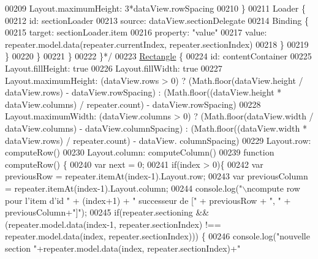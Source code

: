 \begin{DoxyCode}
{00209 \textcolor{comment}{                            Layout.maximumHeight: 3*dataView.rowSpacing}
00210 \textcolor{comment}{                        \}}
00211 \textcolor{comment}{                        Loader \{}
00212 \textcolor{comment}{                            id: sectionLoader}
00213 \textcolor{comment}{                            source: dataView.sectionDelegate}
00214 \textcolor{comment}{                            Binding \{}
00215 \textcolor{comment}{                                target: sectionLoader.item}
00216 \textcolor{comment}{                                property: "value"}
00217 \textcolor{comment}{                                value: repeater.model.data(repeater.currentIndex, repeater.sectionIndex)}
00218 \textcolor{comment}{                            \}}
00219 \textcolor{comment}{                        \}}
00220 \textcolor{comment}{                    \}}
00221 \textcolor{comment}{                \}}
00222 \textcolor{comment}{            \}*/}
00223         \hyperlink{classRectangle}{Rectangle} \{
00224             \textcolor{keywordtype}{id}: contentContainer
00225             Layout.fillHeight: \textcolor{keyword}{true}
00226             Layout.fillWidth: \textcolor{keyword}{true}
00227             Layout.maximumHeight: (dataView.rows > 0) ? (Math.floor(dataView.height / dataView.rows) - 
      dataView.rowSpacing) : (Math.floor((dataView.height * dataView.columns) / repeater.count) - dataView.rowSpacing)
00228             Layout.maximumWidth: (dataView.columns > 0) ? (Math.floor(dataView.width / dataView.columns) - 
      dataView.columnSpacing) : (Math.floor((dataView.width * dataView.rows) / repeater.count) - dataView.
      columnSpacing)
00229             Layout.row: computeRow()
00230             Layout.column: computeColumn()
00239             function computeRow() \{
00240                 var next = 0;
00241                 \textcolor{keywordflow}{if}(index > 0)\{
00242                     var previousRow = repeater.itemAt(index-1).Layout.row;
00243                     var previousColumn = repeater.itemAt(index-1).Layout.column;
00244                     console.log(\textcolor{stringliteral}{"\(\backslash\)ncompute row pour l'item  d'id "} + (index+1) + \textcolor{stringliteral}{" successeur de ["} + 
      previousRow + \textcolor{stringliteral}{", "} + previousColumn+\textcolor{stringliteral}{"]"});
00245                     \textcolor{keywordflow}{if}(repeater.sectioning && (repeater.model.data(index-1, repeater.sectionIndex) !== 
      repeater.model.data(index, repeater.sectionIndex))) \{
00246                         console.log(\textcolor{stringliteral}{"nouvelle section "}+repeater.model.data(index, repeater.sectionIndex)+\textcolor{stringliteral}{"
}}
\end{DoxyCode}
